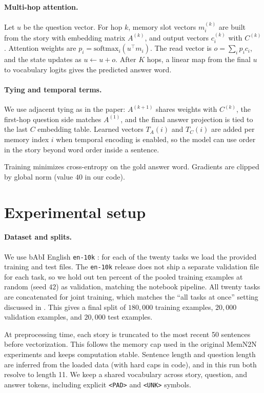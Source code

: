\documentclass{article}
\begin{document}
\paragraph{Multi-hop attention.}
Let $u$ be the question vector. For hop $k$, memory slot vectors $m_i^{(k)}$ are built from the story with embedding matrix $A^{(k)}$, and output vectors $c_i^{(k)}$ with $C^{(k)}$. Attention weights are $p_i = \mathrm{softmax}_i( u^\top m_i )$. The read vector is $o = \sum_i p_i c_i$, and the state updates as $u \leftarrow u + o$. After $K$ hops, a linear map from the final $u$ to vocabulary logits gives the predicted answer word.

\paragraph{Tying and temporal terms.}
We use adjacent tying as in the paper: $A^{(k+1)}$ shares weights with $C^{(k)}$, the first-hop question side matches $A^{(1)}$, and the final answer projection is tied to the last $C$ embedding table. Learned vectors $T_A(i)$ and $T_C(i)$ are added per memory index $i$ when temporal encoding is enabled, so the model can use order in the story beyond word order inside a sentence.

Training minimizes cross-entropy on the gold answer word. Gradients are clipped by global norm (value $40$ in our code).

\section{Experimental setup}

\paragraph{Dataset and splits.}
We use bAbI English \texttt{en-10k} \citep{weston2015towards}: for each of the twenty tasks we load the provided training and test files. The \texttt{en-10k} release does not ship a separate validation file for each task, so we hold out ten percent of the pooled training examples at random (seed $42$) as validation, matching the notebook pipeline. All twenty tasks are concatenated for joint training, which matches the ``all tasks at once'' setting discussed in \citet{sukhbaatar2015end}.
This gives a final split of $180{,}000$ training examples, $20{,}000$ validation examples, and $20{,}000$ test examples.

At preprocessing time, each story is truncated to the most recent 50 sentences before vectorization. This follows the memory cap used in the original MemN2N experiments and keeps computation stable. Sentence length and question length are inferred from the loaded data (with hard caps in code), and in this run both resolve to length 11. We keep a shared vocabulary across story, question, and answer tokens, including explicit \texttt{<PAD>} and \texttt{<UNK>} symbols.
\end{document}

